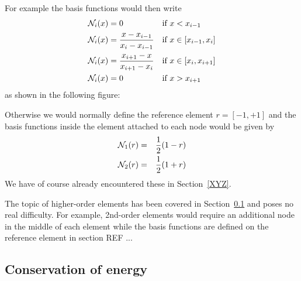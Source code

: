 For example the basis functions would then write 
\begin{align}
{\mathcal{N}}_i(x) &= 0 & \text{if } &x < x_{i-1} \nonumber\\
{\mathcal{N}}_i(x) &=  \frac{x-x_{i-1}}{x_i-x_{i-1}}& \text{if } & x\in [x_{i-1},x_{i}] \nonumber\\
{\mathcal{N}}_i(x) &=  \frac{x_{i+1}-x}{x_{i+1}-x_i}   & \text{if } &x \in [x_{i},x_{i+1}] \nonumber\\
{\mathcal{N}}_i(x) &= 0 & \text{if } &x >x_{i+1} \nonumber
\end{align}
as shown in the following figure:
\begin{center}
\end{center}

Otherwise we would normally define the reference element $r=[-1,+1]$ and the 
basis functions inside the element attached to each node would be given by
\begin{eqnarray}
{\mathcal{N}}_1(r) &=& \frac12 (1-r) \\
{\mathcal{N}}_2(r) &=& \frac12 (1+r) 
\end{eqnarray}
We have of course already encountered these in Section~\ref{XYZ}.


The topic of higher-order elements has been covered in Section~\ref{} and poses no 
real difficulty. For example, 2nd-order elements would require an additional 
node in the middle of each element while the basis functions are defined on 
the reference element in section REF ... 

\subsection{Conservation of energy}


